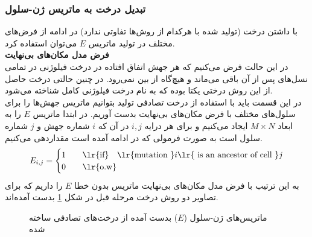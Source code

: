 \subsubsection{تبدیل درخت به ماتریس ژن-سلول}
با داشتن درخت (تولید شده با هرکدام از روش‌ها تفاوتی ندارد) در ادامه از فرض‌های مختلف در تولید ماتریس $E$ می‌توان استفاده کرد.
\vspace{20pt}
\\
\noindent\textbf{فرض مدل مکان‌های بی‌نهایت}\\
در این حالت فرض می‌کنیم که هر جهش اتفاق افتاده در درخت فیلوژنی در تمامی نسل‌های پس از آن باقی می‌ماند و هیچ‌گاه از بین نمی‌رود. در چنین حالتی درخت حاصل از این روش درختی یکتا بوده که به نام درخت فیلوژنی کامل شناخته می‌شود.
\\
در این قسمت باید با استفاده از درخت تصادفی تولید بتوانیم ماتریس جهش‌ها را برای سلول‌های مختلف با فرض مکان‌های بی‌نهایت بدست آوریم. 
در ابتدا ماتریس $E$ را به ابعاد $M\times N$ ایجاد می‌کنیم و برای هر درایه $i,j$ در آن که $i$ شماره جهش و $j$ شماره سلول است به صورت فرمولی که در ادامه آمده است مقداردهی می‌کنیم.
\begin{equation}
	E_{i,j} = 
	\begin{cases} 
		1  \quad &\text{\lr{if}} \quad \text{\lr{mutation }} i \text{\lr{ is an ancestor of cell }} j \\
		0 \quad &\text{\lr{o.w}}
	\end{cases}
\end{equation}
به این ترتیب با فرض مدل مکان‌های بی‌نهایت ماتریس بدون خطا $E$ را داریم که برای تصاویر دو روش درخت مرحله قبل در شکل \ref{fig:E} بدست آمده‌اند.
\begin{figure}[!ht]
	\centering
	\hfill
	\caption{ماتریس‌های ژن-سلول ($E$) بدست آمده از درخت‌های تصادفی ساخته شده}
	\label{fig:E}
\end{figure}

